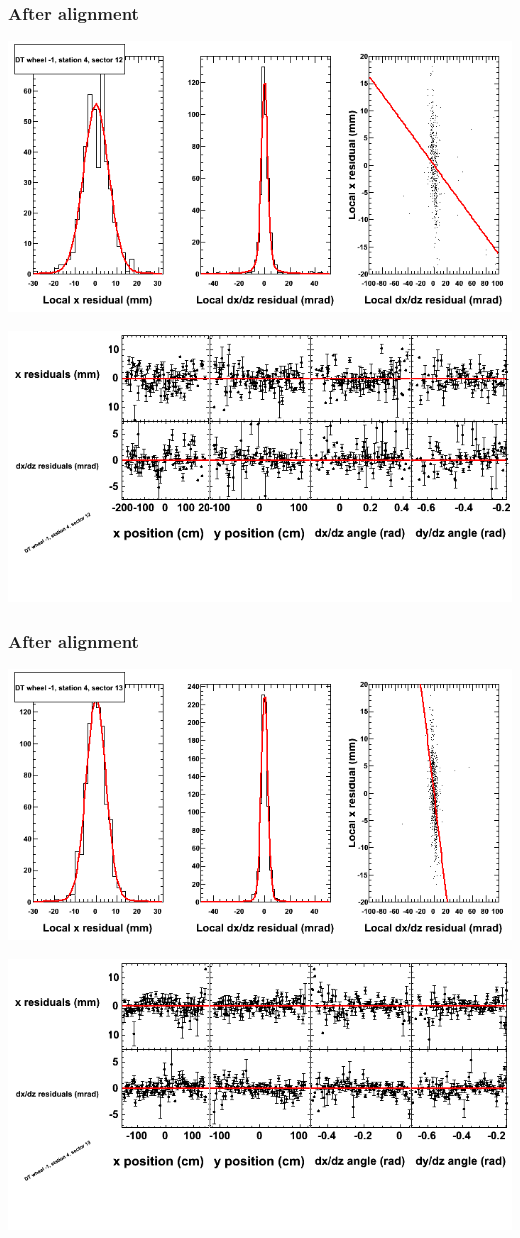 \documentclass[compress]{beamer}
\begin{document}
\begin{frame}
\frametitle{After alignment}
\includegraphics[width=0.7\linewidth]{NOV4_fitfunctions/MBwhBst4sec12_bellcurves.png}

\includegraphics[width=0.7\linewidth]{NOV4_fitfunctions/MBwhBst4sec12_polynomials.png}
\end{frame}

\begin{frame}
\frametitle{After alignment}
\includegraphics[width=0.7\linewidth]{NOV4_fitfunctions/MBwhBst4sec13_bellcurves.png}

\includegraphics[width=0.7\linewidth]{NOV4_fitfunctions/MBwhBst4sec13_polynomials.png}
\end{frame}
\end{document}

